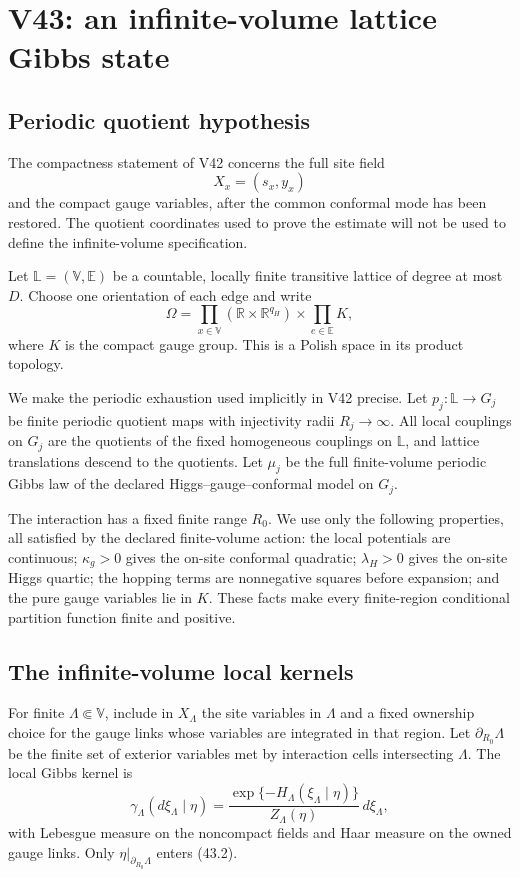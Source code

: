 \documentclass[11pt]{article}
\theoremstyle{remark}
\begin{document}
\section{V43: an infinite-volume lattice Gibbs state}
\label{sec:v17v43}

\subsection{Periodic quotient hypothesis}

The compactness statement of V42 concerns the full site field
\[
 X_x=(s_x,y_x)
\]
and the compact gauge variables, after the common conformal mode has
been restored.  The quotient coordinates used to prove the estimate
will not be used to define the infinite-volume specification.

Let \(\mathbb L=(\mathbb V,\mathbb E)\) be a countable, locally finite
transitive lattice of degree at most \(D\).  Choose one orientation of
each edge and write
\[
 \Omega=
 \prod_{x\in\mathbb V}(\mathbb R\times\mathbb R^{q_H})
 \times\prod_{e\in\mathbb E}K,                    \tag{43.1}
\]
where \(K\) is the compact gauge group.  This is a Polish space in its
product topology.

We make the periodic exhaustion used implicitly in V42 precise.  Let
\(p_j:\mathbb L\to G_j\) be finite periodic quotient maps with
injectivity radii \(R_j\to\infty\).  All local couplings on \(G_j\) are
the quotients of the fixed homogeneous couplings on \(\mathbb L\), and
lattice translations descend to the quotients.  Let \(\mu_j\) be the
full finite-volume periodic Gibbs law of the declared
Higgs--gauge--conformal model on \(G_j\).

The interaction has a fixed finite range \(R_0\).  We use only the
following properties, all satisfied by the declared finite-volume
action: the local potentials are continuous; \(\kappa_g>0\) gives the
on-site conformal quadratic; \(\lambda_H>0\) gives the on-site Higgs
quartic; the hopping terms are nonnegative squares before expansion;
and the pure gauge variables lie in \(K\).  These facts make every
finite-region conditional partition function finite and positive.

\subsection{The infinite-volume local kernels}

For finite \(\Lambda\Subset\mathbb V\), include in \(X_\Lambda\) the
site variables in \(\Lambda\) and a fixed ownership choice for the
gauge links whose variables are integrated in that region.  Let
\(\partial_{R_0}\Lambda\) be the finite set of exterior variables met
by interaction cells intersecting \(\Lambda\).  The local Gibbs kernel
is
\[
 \gamma_\Lambda(d\xi_\Lambda\mid\eta)
 =
 \frac{\exp\{-H_\Lambda(\xi_\Lambda\mid\eta)\}}
 {Z_\Lambda(\eta)}
 \,d\xi_\Lambda,                                  \tag{43.2}
\]
with Lebesgue measure on the noncompact fields and Haar measure on the
owned gauge links.  Only
\(\eta|_{\partial_{R_0}\Lambda}\) enters (43.2).
\end{document}
